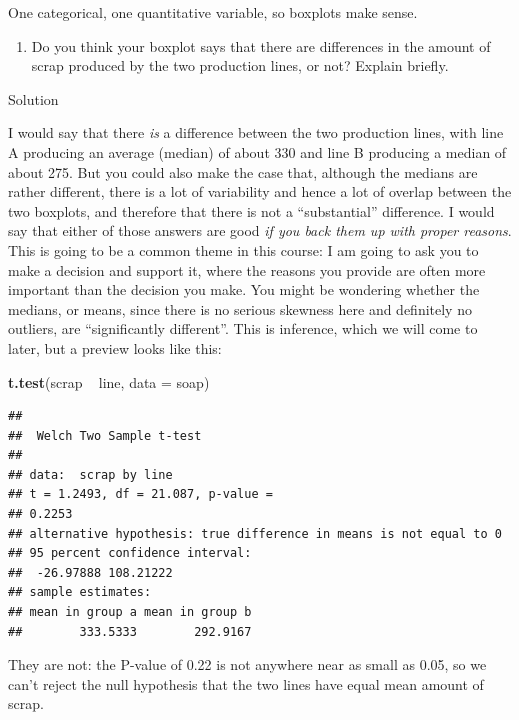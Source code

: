 \documentclass[]{tufte-book}
\newenvironment{Shaded}{}{}
\newcommand{\DataTypeTok}[1]{\textcolor[rgb]{0.56,0.13,0.00}{#1}}
\newcommand{\KeywordTok}[1]{\textcolor[rgb]{0.00,0.44,0.13}{\textbf{#1}}}
\newcommand{\NormalTok}[1]{#1}
\newcommand{\OperatorTok}[1]{\textcolor[rgb]{0.40,0.40,0.40}{#1}}
\newcommand{\StringTok}[1]{\textcolor[rgb]{0.25,0.44,0.63}{#1}}
\providecommand{\tightlist}{%
  \setlength{\itemsep}{0pt}\setlength{\parskip}{0pt}}
\theoremstyle{definition}
\theoremstyle{definition}
\theoremstyle{definition}
\theoremstyle{remark}
\begin{document}
One categorical, one quantitative variable, so boxplots make sense.

\begin{enumerate}
\def\labelenumi{(\alph{enumi})}
\setcounter{enumi}{4}
\tightlist
\item
  Do you think your boxplot says that there are differences in the
  amount of scrap produced by the two production lines, or not? Explain
  briefly.
\end{enumerate}

Solution

I would say that there \emph{is} a difference between the two production
lines, with line A producing an average (median) of about 330 and line B
producing a median of about 275. But you could also make the case that,
although the medians are rather different, there is a lot of variability
and hence a lot of overlap between the two boxplots, and therefore that
there is not a ``substantial'' difference. I would say that either of
those answers are good \emph{if you
back them up with proper reasons}. This is going to be a common theme in
this course: I am going to ask you to make a decision and support it,
where the reasons you provide are often more important than the decision
you make. You might be wondering whether the medians, or means, since
there is no serious skewness here and definitely no outliers, are
``significantly different''. This is inference, which we will come to
later, but a preview looks like this:

\begin{Shaded}
\begin{Highlighting}[]
\KeywordTok{t.test}\NormalTok{(scrap }\OperatorTok{~}\StringTok{ }\NormalTok{line, }\DataTypeTok{data =}\NormalTok{ soap)}
\end{Highlighting}
\end{Shaded}

\begin{verbatim}
## 
##  Welch Two Sample t-test
## 
## data:  scrap by line
## t = 1.2493, df = 21.087, p-value =
## 0.2253
## alternative hypothesis: true difference in means is not equal to 0
## 95 percent confidence interval:
##  -26.97888 108.21222
## sample estimates:
## mean in group a mean in group b 
##        333.5333        292.9167
\end{verbatim}

They are not: the P-value of 0.22 is not anywhere near as small as 0.05,
so we can't reject the null hypothesis that the two lines have equal
mean amount of scrap.
\end{document}
